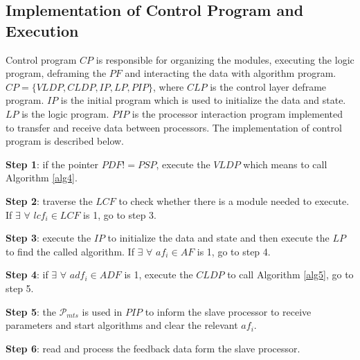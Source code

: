 \documentclass[journal,UTF8]{IEEEtran}
\begin{document}


\subsection{Implementation of Control Program and Execution}
Control program $CP$ is responsible for organizing the modules, executing the logic program, deframing the $PF$ and interacting the data with algorithm program. $CP=\{VLDP,CLDP, IP, LP, PIP\}$, where $CLP$ is the control layer deframe program. $IP$ is the initial program which is used to initialize the data and state. $LP$ is the logic program. $PIP$ is the processor interaction program implemented to transfer and receive data between processors. The implementation of control program is described below.

\textbf{Step 1}: if the pointer $PDF!=PSP$, execute the $VLDP$ which means to call Algorithm \ref{alg4}.

\textbf{Step 2}: traverse the $LCF$ to check whether there is a module needed to execute. If $\exists$ $\forall$ $lcf_i \in LCF$ is 1, go to step 3.

\textbf{Step 3}: execute the $IP$ to initialize the data and state and then execute the $LP$ to find the called algorithm. If $\exists$ $\forall$ $af_i \in AF$ is 1, go to step 4. 

\textbf{Step 4}: if $\exists$ $\forall$ $adf_i \in ADF$ is 1, execute the $CLDP$ to call Algorithm \ref{alg5}, go to step 5. 

\textbf{Step 5}: the $\mathcal{P}_{mts}$ is used in $PIP$ to inform the slave processor to receive parameters and start algorithms and clear the relevant $af_i$.   

\textbf{Step 6}: read and process the feedback data form the slave processor. 


\end{document}
